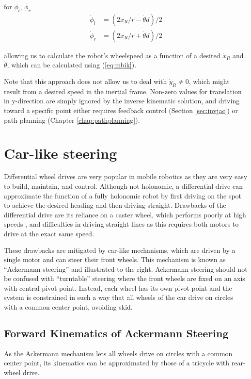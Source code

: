 for $ \phi_l$, $ \phi_r$
\begin{eqnarray}
\dot{\phi}_l &= (2\dot{x}_R/r - \dot{\theta}d)/2\\
\nonumber
\dot{\phi}_r &= (2\dot{x}_R/r + \dot{\theta}d)/2
\end{eqnarray}

allowing us to calculate the robot's wheelspeed as a function of a desired $\dot{x}_R$ and $\dot{\theta}$, which can be calculated using (\ref{eq:mbik}).

Note that this approach does not allow us to deal with $\dot{y}_R \neq 0$, which might result from a desired speed in the inertial frame. Non-zero values for translation in y-direction are simply ignored by the inverse kinematic solution, and driving toward a specific point either requires feedback control (Section \ref{sec:invjac}) or path planning (Chapter \ref{chap:pathplanning}). 


\section{Car-like steering}
Differential wheel drives are very popular in mobile robotics as they are very easy to build, maintain, and control. Although not holonomic, a differential drive can approximate the function of a fully holonomic robot by first driving on the spot to achieve the desired heading and then driving straight. Drawbacks of the differential drive are its reliance on a caster wheel, which performs poorly at high speeds , and difficulties in driving straight lines as this requires both motors to drive at the exact same speed.


These drawbacks are mitigated by car-like mechanisms, which are driven by a single motor and can steer their front wheels. This mechanism is known as ``Ackermann steering''  and illustrated to the right. Ackermann steering should not be confused with ``turntable'' steering  where the front wheels are fixed on an axis with central pivot point. Instead, each wheel has its own pivot point and the system is constrained in such a way that all wheels of the car drive on circles with a common center point, avoiding skid.

\subsection{Forward Kinematics of Ackermann Steering}
As the Ackermann mechanism lets all wheels drive on circles with a common center point, its kinematics can be approximated by those of a tricycle with rear-wheel drive.

